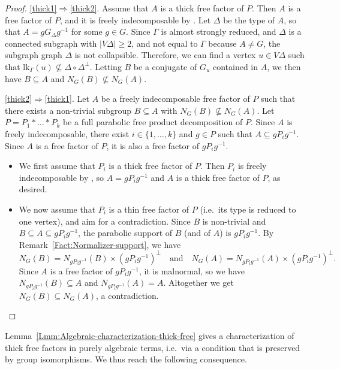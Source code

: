 \documentclass[a4paper,english,11pt]{article}
\theoremstyle{definition}
\theoremstyle{remark}
\newcommand{\lk}{\mathrm{lk}}
\begin{document}
\begin{proof}
\ref{thick1}$\Rightarrow$\ref{thick2}. Assume that $A$ is a thick free factor of $P$. Then $A$ is a free factor of $P$, and it is freely indecomposable by \cite[Lemma~4.7]{Gre}. Let $\Delta$ be the type of $A$, so that $A=gG_{\Delta}g^{-1}$ for some $g\in G$. Since $\Gamma$ is almost strongly reduced, and $\Delta$ is a connected subgraph with $|V\Delta|\ge 2$, and not equal to $\Gamma$ because $A\neq G$, the subgraph graph $\Delta$ is not collapsible. Therefore, we can find a vertex $u\in V\Delta$ such that $\lk_{\Gamma}(u)\not\subseteq {\Delta\circ\Delta^\perp}$. Letting $B$ be a conjugate of $G_u$ contained in $A$, we then have $B\subseteq A$ and $N_G(B)\not\subseteq N_G(A)$.

\medskip

\noindent \ref{thick2}$\Rightarrow$\ref{thick1}. Let $A$ be a freely indecomposable free factor of $P$ such that there exists a non-trivial subgroup $B\subseteq A$ with $N_G(B)\not\subseteq N_G(A)$. Let $P=P_1\ast\dots\ast P_k$ be a full parabolic free product decomposition of $P$. Since $A$ is freely indecomposable, there exist $i\in\{1,\dots,k\}$ and $g\in P$ such that $A\subseteq g P_ig^{-1}$. Since $A$ is a free factor of $P$, it is also a free factor of $gP_ig^{-1}$.
\begin{itemize}
\item We first assume that $P_i$ is a thick free factor of $P$. Then $P_i$ is freely indecomposable by \cite[Lemma~4.7]{Gre}, so $A=gP_ig^{-1}$ and $A$ is a thick free factor of $P$, as desired.
\item We now assume that $P_i$ is a thin free factor of $P$ (i.e.\ its type is reduced to one vertex), and aim for a contradiction. Since $B$ is non-trivial and $B\subseteq A\subseteq gP_ig^{-1}$, the parabolic support of $B$ (and of $A$) is $gP_ig^{-1}$. By Remark~\ref{Fact:Normalizer-support}, we have 
\[N_G(B)=N_{gP_ig^{-1}}(B)\times (gP_ig^{-1})^\perp \quad\text{and}\quad N_G(A)=N_{gP_ig^{-1}}(A)\times (gP_ig^{-1})^\perp.\] 
Since $A$ is a free factor of $gP_ig^{-1}$, it is malnormal, so we have $N_{gP_ig^{-1}}(B)\subseteq A$ and $N_{gP_ig^{-1}}(A)=A$. Altogether we get $N_{G}(B)\subseteq N_G(A)$, a contradiction. \qedhere
\end{itemize}
\end{proof}

Lemma~\ref{Lmm:Algebraic-characterization-thick-free} gives a characterization of thick free factors in purely algebraic terms, i.e.\ via a condition that is preserved by group isomorphisms. We thus reach the following consequence.
\end{document}
